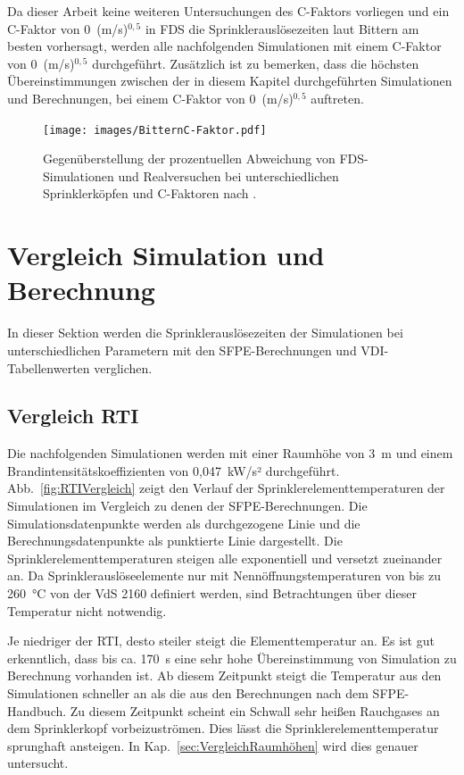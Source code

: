 Da dieser Arbeit keine weiteren Untersuchungen des C-Faktors vorliegen und ein C-Faktor von 0~(m/s)$^{0,5}$ in FDS die Sprinklerauslösezeiten laut Bittern am besten vorhersagt, werden alle nachfolgenden Simulationen mit einem C-Faktor von 0~(m/s)$^{0,5}$ durchgeführt. Zusätzlich ist zu bemerken, dass die höchsten Übereinstimmungen zwischen der in diesem Kapitel durchgeführten Simulationen und Berechnungen, bei einem C-Faktor von 0~(m/s)$^{0,5}$ auftreten.


\begin{figure}
    \centering
    \texttt{[image: images/BitternC-Faktor.pdf]}
    \caption{Gegenüberstellung der prozentuellen Abweichung von FDS-Simulationen und Realversuchen bei unterschiedlichen Sprinklerköpfen und C-Faktoren nach \cite{Bittern2004}.}
    \label{fig:BitternC-Faktor}
\end{figure}



\section{Vergleich Simulation und Berechnung}
\label{sec:VergleichSimulationundBerechnung}

In dieser Sektion werden die Sprinklerauslösezeiten der Simulationen bei unterschiedlichen Parametern mit den SFPE-Berechnungen und VDI-Tabellenwerten verglichen.

\subsection{Vergleich RTI}

Die nachfolgenden Simulationen werden mit einer Raumhöhe von 3~m und einem Brand\-in\-ten\-si\-täts\-ko\-ef\-fi\-zien\-ten von 0,047~kW/s² durchgeführt. 
Abb.~\ref{fig:RTIVergleich} zeigt den Verlauf der Sprinklerelementtemperaturen der Simulationen im Vergleich zu denen der SFPE-Berechnungen. Die Simulationsdatenpunkte werden als durchgezogene Linie und die Berechnungsdatenpunkte als punktierte Linie dargestellt. Die Sprinklerelementtemperaturen steigen alle exponentiell und versetzt zueinander an. Da Sprinklerauslöseelemente nur mit Nenn\-öff\-nungs\-tem\-pe\-ra\-tu\-ren von bis zu 260~°C von der VdS 2160 definiert werden, sind Betrachtungen über dieser Temperatur nicht notwendig. 

Je niedriger der RTI, desto steiler steigt die Elementtemperatur an. Es ist gut erkenntlich, dass bis ca. 170~s eine sehr hohe Übereinstimmung von Simulation zu Berechnung vorhanden ist. Ab diesem Zeitpunkt steigt die Temperatur aus den Simulationen schneller an als die aus den Berechnungen nach dem SFPE-Handbuch. Zu diesem Zeitpunkt scheint ein Schwall sehr heißen Rauchgases an dem Sprinklerkopf vorbeizuströmen. Dies lässt die Sprinklerelementtemperatur sprunghaft ansteigen. In Kap.~\ref{sec:VergleichRaumhöhen} wird dies genauer untersucht.

